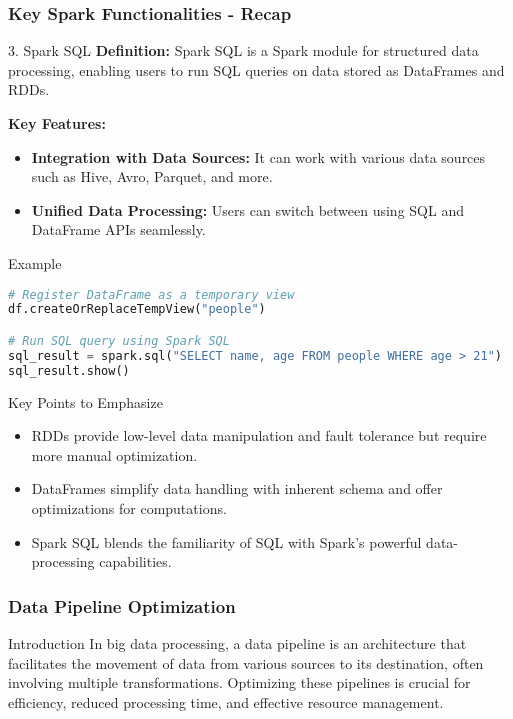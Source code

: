 \documentclass[aspectratio=169]{beamer}
\begin{document}
\begin{frame}[fragile]
    \frametitle{Key Spark Functionalities - Recap}
    \begin{block}{3. Spark SQL}
        \textbf{Definition:} Spark SQL is a Spark module for structured data processing, enabling users to run SQL queries on data stored as DataFrames and RDDs.

        \textbf{Key Features:}
        \begin{itemize}
            \item \textbf{Integration with Data Sources:} It can work with various data sources such as Hive, Avro, Parquet, and more.
            \item \textbf{Unified Data Processing:} Users can switch between using SQL and DataFrame APIs seamlessly.
        \end{itemize}
    \end{block}
    
    \begin{block}{Example}
        \begin{lstlisting}[language=Python]
# Register DataFrame as a temporary view
df.createOrReplaceTempView("people")

# Run SQL query using Spark SQL
sql_result = spark.sql("SELECT name, age FROM people WHERE age > 21")
sql_result.show()
        \end{lstlisting}
    \end{block}
    
    \begin{block}{Key Points to Emphasize}
        \begin{itemize}
            \item RDDs provide low-level data manipulation and fault tolerance but require more manual optimization.
            \item DataFrames simplify data handling with inherent schema and offer optimizations for computations.
            \item Spark SQL blends the familiarity of SQL with Spark’s powerful data-processing capabilities.
        \end{itemize}
    \end{block}
\end{frame}

\begin{frame}
    \titlepage
\end{frame}

\begin{frame}
    \frametitle{Data Pipeline Optimization}
    \begin{block}{Introduction}
        In big data processing, a data pipeline is an architecture that facilitates the movement of data from various sources to its destination, often involving multiple transformations. Optimizing these pipelines is crucial for efficiency, reduced processing time, and effective resource management.
    \end{block}
\end{frame}
\end{document}
